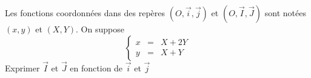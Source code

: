 Les fonctions coordonn{\'e}es dans des rep{\`e}res $(O,\overrightarrow{i}, \overrightarrow{j})$ et $(O,\overrightarrow{I}, \overrightarrow{J})$ sont not{\'e}es $(x,y)$ et $(X,Y)$. On suppose\[\left\lbrace \begin{array}{ccc}
x & = & X+2Y \\ y & = & X+Y \end{array} \right.\] Exprimer $\overrightarrow{I}$ et $\overrightarrow{J}$ en fonction de $\overrightarrow{i}$ et $\overrightarrow{j}$ \bigskip \bigskip \bigskip